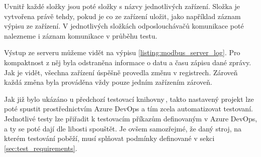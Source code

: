Uvnitř každé složky jsou poté složky s názvy jednotlivých zařízení. Složka je vytvořena právě tehdy, pokud je co ze zařízení uložit, jako například záznam výpisu ze zařízení. V jednotlivých složkách odposlouchávačů komunikace poté nalezneme i záznam komunikace v průběhu testu. 

Výstup ze serveru můžeme vidět na výpisu \ref{listing:modbus_server_log}. Pro kompaktnost z něj byla odstraněna informace o datu a času zápisu dané zprávy. Jak je vidět, všechna zařízení úspěšně provedla změnu v registrech. Zároveň každá změna byla prováděna vždy pouze jedním zařízením zároveň.

Jak již bylo ukázáno u předchozí testovací knihovny\,\cite{bakalarka}, takto nastavený projekt lze poté spustit prostřednictvím Azure DevOps a tím zcela automatizovat testovaní. Jednotlivé testy lze přiřadit k testovacím příkazům definovaným v Azure DevOps, a ty se poté dají dle libosti spouštět. Je ovšem samozřejmé, že daný stroj, na kterém testování poběží, musí splňovat podmínky definované v sekci \ref{sec:test_requirements}.


